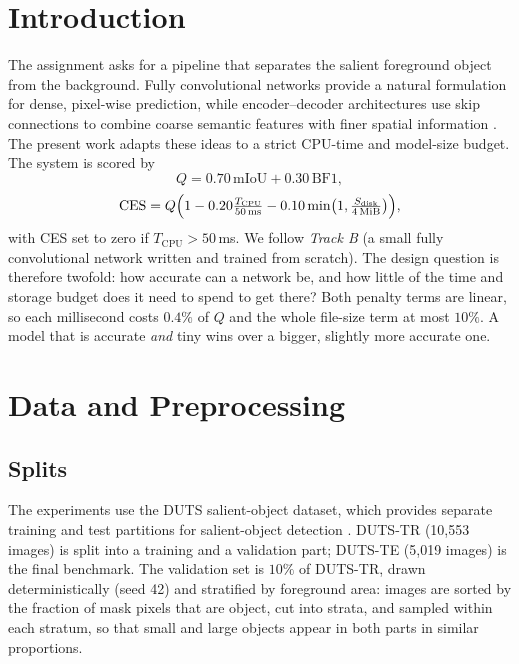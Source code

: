 \documentclass[10pt,a4paper,twocolumn]{article}
\newcommand{\Tcpu}{T_{\mathrm{CPU}}}
\newcommand{\Sdisk}{S_{\mathrm{disk}}}
\begin{document}
\section{Introduction}
The assignment asks for a pipeline that separates the salient foreground object from the background. Fully convolutional networks provide a natural formulation for dense, pixel-wise prediction, while encoder--decoder architectures use skip connections to combine coarse semantic features with finer spatial information \cite{long2015fcn,ronneberger2015unet}. The present work adapts these ideas to a strict CPU-time and model-size budget. The system is scored by
\begin{equation}
Q = 0.70\,\mathrm{mIoU} + 0.30\,\mathrm{BF1},
\end{equation}
\begin{equation}
\mathrm{CES} = Q\Bigl(1-0.20\tfrac{\Tcpu}{50\,\mathrm{ms}}-0.10\min\bigl(1,\tfrac{\Sdisk}{4\,\mathrm{MiB}}\bigr)\Bigr),
\end{equation}
with CES set to zero if $\Tcpu>50$\,ms. We follow \emph{Track B} (a small fully convolutional network written and trained from scratch). The design question is therefore twofold: how accurate can a network be, and how little of the time and storage budget does it need to spend to get there? Both penalty terms are linear, so each millisecond costs $0.4\%$ of $Q$ and the whole file-size term at most $10\%$. A model that is accurate \emph{and} tiny wins over a bigger, slightly more accurate one.

\section{Data and Preprocessing}
\subsection{Splits}
The experiments use the DUTS salient-object dataset, which provides separate training and test partitions for salient-object detection \cite{wang2017duts,dutswebsite}. DUTS-TR (10{,}553 images) is split into a training and a validation part; DUTS-TE (5{,}019 images) is the final benchmark. The validation set is $10\%$ of DUTS-TR, drawn deterministically (seed 42) and stratified by foreground area: images are sorted by the fraction of mask pixels that are object, cut into strata, and sampled within each stratum, so that small and large objects appear in both parts in similar proportions.
\end{document}
